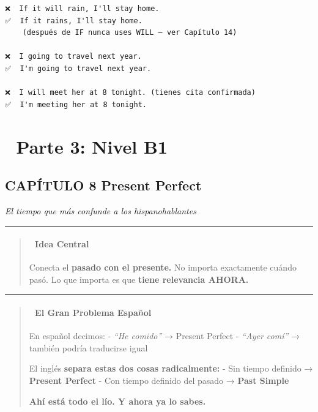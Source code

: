 \documentclass[
  spanish,
  letterpaper,
]{scrbook}
\begin{document}
\begin{verbatim}
❌  If it will rain, I'll stay home.
✅  If it rains, I'll stay home.
    (después de IF nunca uses WILL — ver Capítulo 14)

❌  I going to travel next year.
✅  I'm going to travel next year.

❌  I will meet her at 8 tonight. (tienes cita confirmada)
✅  I'm meeting her at 8 tonight.
\end{verbatim}

\part{📙 Parte 3: Nivel B1}

\chapter{CAPÍTULO 8 Present
Perfect}\label{capuxedtulo-8-present-perfect}

\emph{El tiempo que más confunde a los hispanohablantes}

\begin{center}\rule{0.5\linewidth}{0.5pt}\end{center}

\begin{quote}
\subsection{🎯 Idea Central}\label{idea-central-6}

Conecta el \textbf{pasado con el presente.} No importa exactamente
cuándo pasó. Lo que importa es que \textbf{tiene relevancia AHORA.}
\end{quote}

\begin{center}\rule{0.5\linewidth}{0.5pt}\end{center}

\begin{quote}
\subsection{🧠 El Gran Problema
Español}\label{el-gran-problema-espauxf1ol}

En español decimos: - \emph{``He comido''} → Present Perfect -
\emph{``Ayer comí''} → también podría traducirse igual

El inglés \textbf{separa estas dos cosas radicalmente:} - Sin tiempo
definido → \textbf{Present Perfect} - Con tiempo definido del pasado →
\textbf{Past Simple}

\textbf{Ahí está todo el lío. Y ahora ya lo sabes.}
\end{quote}
\end{document}
